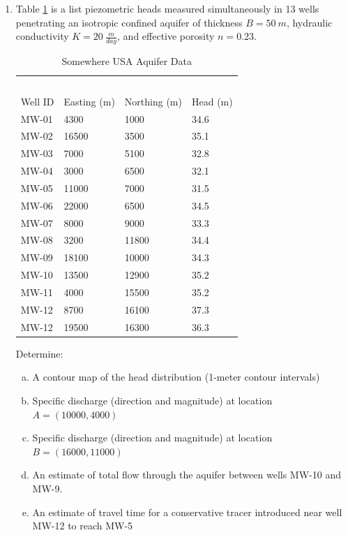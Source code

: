 \documentclass[12pt]{article}
\begin{document}
\begin{enumerate}
\clearpage

\item Table \ref{tab:SomewhereUSAAquifer} is a list piezometric heads measured simultaneously in 13 wells penetrating an isotropic confined aquifer of thickness $B=50~m$, hydraulic conductivity $K=20~\frac{m}{day}$, and effective porosity $n=0.23$. 

\begin{table}[h!]
\centering
\caption{Somewhere USA Aquifer Data}
\begin{tabular}{p{1.0in}p{1.5in}p{1.5in}p{1.0in}} %
~&~\\
Well ID & Easting (m) & Northing (m) & Head (m) \\
\hline
\hline
MW-01 & 4300  &  1000 & 34.6 \\
MW-02 & 16500 &  3500 & 35.1 \\
MW-03 &  7000 &  5100 & 32.8 \\
MW-04 &  3000 &  6500 & 32.1 \\
MW-05 & 11000 &  7000 & 31.5 \\
MW-06 & 22000 &  6500 & 34.5 \\
MW-07 &  8000 &  9000 & 33.3 \\
MW-08 &  3200 & 11800 & 34.4 \\
MW-09 & 18100 & 10000 & 34.3 \\
MW-10 & 13500 & 12900 & 35.2 \\
MW-11 &  4000 & 15500 & 35.2 \\
MW-12 &  8700 & 16100 & 37.3 \\
MW-12 & 19500 & 16300 & 36.3 \\
\hline
\end{tabular}
\label{tab:SomewhereUSAAquifer}
\end{table} 

Determine:
    \begin{enumerate}[a)]
        \item A contour map of the head distribution (1-meter contour intervals)
        \item Specific discharge (direction and magnitude) at location $A=(10000,4000)$
        \item Specific discharge (direction and magnitude) at location $B=(16000,11000)$
        \item An estimate of total flow through the aquifer between wells MW-10 and MW-9.
        \item An estimate of travel time for a conservative tracer introduced near well MW-12 to reach MW-5
    \end{enumerate}

\clearpage







\end{enumerate}
\end{document}

